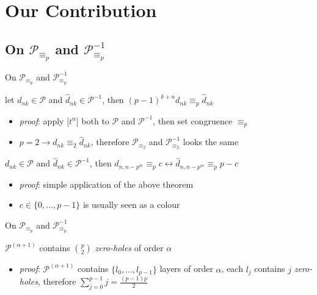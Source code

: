 \documentclass[10pt,serif, professionalfont]{beamer}
\begin{document}
\section{Our Contribution}

\subsection{On $\mathcal{P}_{\equiv_{p}}$ and $\mathcal{P}_{\equiv_{p}}^{-1}$}

\begin{frame}{On $\mathcal{P}_{\equiv_{p}}$ and $\mathcal{P}_{\equiv_{p}}^{-1}$}
    \begin{theorem}
        let $d_{nk}\in\mathcal{P}$ and  $\hat{d}_{nk}\in\mathcal{P}^{-1}$, then
            $(p-1)^{k+n}d_{nk}\equiv_{p} \hat{d}_{nk}$
    \end{theorem}
    \begin{itemize}
        \item \emph{proof}: apply $\big[t^{n}\big]$ both to $\mathcal{P}$ and $\mathcal{P}^{-1}$,
            then set congruence $\equiv_{p}$ 
        \item $p=2 \rightarrow d_{nk}\equiv_{2}\hat{d}_{nk}$, therefore $\mathcal{P}_{\equiv_{2}}$ and 
            $\mathcal{P}_{\equiv_{2}}^{-1}$ looks the same
    \end{itemize}
    \pause
    \begin{theorem}
        $d_{nk}\in\mathcal{P}$ and $\hat{d}_{nk}\in\mathcal{P}^{-1}$, then
            \indent $d_{n,n-p^{m}} \equiv_{p} c \leftrightarrow \hat{d}_{n,n-p^{m}} \equiv_{p} p-c$
    \end{theorem}
    \begin{itemize}
        \item \emph{proof}: simple application of the above theorem
        \item $c\in\lbrace0,\ldots,p-1\rbrace$ is usually seen as a colour
    \end{itemize}
\end{frame}

\begin{frame}{On $\mathcal{P}_{\equiv_{p}}$ and $\mathcal{P}_{\equiv_{p}}^{-1}$}
    \begin{theorem}
         $\mathcal{P}^{(\alpha+1)}$ contains 
        ${{p}\choose{2}}$ \emph{zero-holes} of order $\alpha$
    \end{theorem}
    \begin{itemize}
        \item \emph{proof}: $\mathcal{P}^{(\alpha+1)}$ contains $\lbrace l_{0},\ldots,l_{p-1}\rbrace$ 
            layers of order $\alpha$, each $l_{j}$ contains $j$ \emph{zero-holes}, therefore
            $\sum_{j=0}^{p-1}{j}=\frac{(p-1)p}{2}$
    \end{itemize}
\end{frame}
\end{document}
